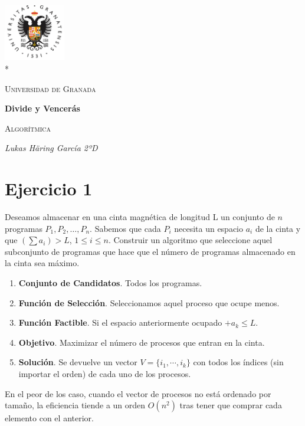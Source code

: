 \documentclass[12pt,a4paper]{report}
\date{\specialdate\today}
\newcommand{\mychapter}[2]{
	\setcounter{chapter}{#1}
	\setcounter{section}{0}
	\chapter*{#2}
	\addcontentsline{toc}{chapter}{#2}
}
\begin{document}
	\begin{titlepage}
		\centering
		\includegraphics[width=0.2\textwidth]{logo-ugr.png}\\*
		{\scshape\LARGE Universidad de Granada \par}
		{\large \date{\specialdate\today}\par}
		\vspace{1cm}
		{\LARGE\bfseries Divide y Vencerás\par}
		\vspace{1.5cm}
		{\scshape\large Algorítmica\par}
		\vspace{2cm}
		{\Large\itshape Lukas Häring García 2ºD\par}
	\end{titlepage}
	\tableofcontents
	\mychapter{0}{Ejercicio 1}
	Deseamos almacenar en una cinta magnética de longitud L un conjunto de $n$ programas ${P_1, P_2, \dots , P_n}$. Sabemos que cada $P_i$ necesita un espacio $a_i$ de la cinta y que $(\sum a_i) > L$, $1\le i \le n$. Construir un
	algoritmo que seleccione aquel subconjunto de programas que hace que el número de programas almacenado en la cinta sea máximo.
	\begin{enumerate}
		\item \textbf{Conjunto de Candidatos}.\newline
		Todos los programas.
		\item \textbf{Función de Selección}.\newline
		Seleccionamos aquel proceso que ocupe menos.
		\item \textbf{Función Factible}.\newline
		Si el espacio anteriormente ocupado $ + a_k \le L$. 
		\item \textbf{Objetivo}.\newline
		Maximizar el número de procesos que entran en la cinta.
		\item \textbf{Solución}.\newline
		Se devuelve un vector $V=\{i_1, \cdots, i_k\}$ con todos los índices (sin importar el orden) de cada uno de los procesos.
	\end{enumerate}
	En el peor de los caso, cuando el vector de procesos no está ordenado por tamaño, la eficiencia tiende a un orden $O(n^2)$ tras tener que comprar cada elemento con el anterior.\newline
\end{document}
